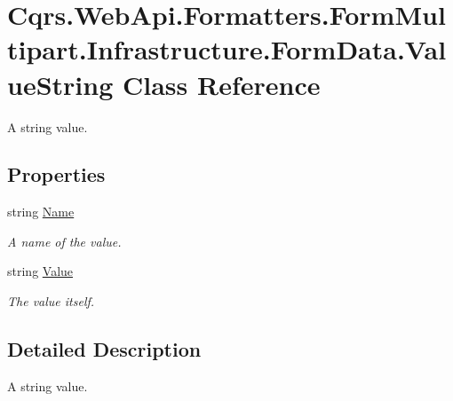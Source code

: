 \hypertarget{classCqrs_1_1WebApi_1_1Formatters_1_1FormMultipart_1_1Infrastructure_1_1FormData_1_1ValueString}{}\section{Cqrs.\+Web\+Api.\+Formatters.\+Form\+Multipart.\+Infrastructure.\+Form\+Data.\+Value\+String Class Reference}
\label{classCqrs_1_1WebApi_1_1Formatters_1_1FormMultipart_1_1Infrastructure_1_1FormData_1_1ValueString}


A string value.  


\subsection*{Properties}
\begin{DoxyCompactItemize}
\item 
string \hyperlink{classCqrs_1_1WebApi_1_1Formatters_1_1FormMultipart_1_1Infrastructure_1_1FormData_1_1ValueString_a75a080b90171a612155590a997076016_a75a080b90171a612155590a997076016}{Name}
\begin{DoxyCompactList}\small\item\em A name of the value. \end{DoxyCompactList}\item 
string \hyperlink{classCqrs_1_1WebApi_1_1Formatters_1_1FormMultipart_1_1Infrastructure_1_1FormData_1_1ValueString_a2e4eb245c5d5148672d233903f2dfcd1_a2e4eb245c5d5148672d233903f2dfcd1}{Value}
\begin{DoxyCompactList}\small\item\em The value itself. \end{DoxyCompactList}\end{DoxyCompactItemize}


\subsection{Detailed Description}
A string value. 



